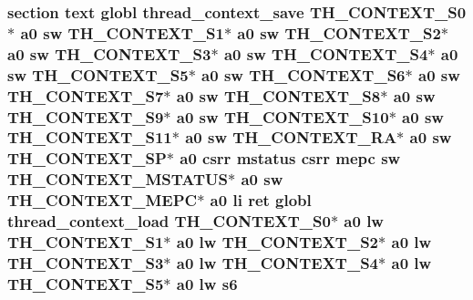 \hypertarget{riscv_2threada_8S_a4fd512995490ab20ebd3b565ccc498c7}{
\subsubsection[{s6}]{\setlength{\rightskip}{0pt plus 5cm}section text globl {\bf thread\-\_\-context\-\_\-save} {\bf T\-H\-\_\-\-C\-O\-N\-T\-E\-X\-T\-\_\-\-S0}$\ast$ {\bf a0} {\bf sw} {\bf T\-H\-\_\-\-C\-O\-N\-T\-E\-X\-T\-\_\-\-S1}$\ast$ {\bf a0} {\bf sw} {\bf T\-H\-\_\-\-C\-O\-N\-T\-E\-X\-T\-\_\-\-S2}$\ast$ {\bf a0} {\bf sw} {\bf T\-H\-\_\-\-C\-O\-N\-T\-E\-X\-T\-\_\-\-S3}$\ast$ {\bf a0} {\bf sw} {\bf T\-H\-\_\-\-C\-O\-N\-T\-E\-X\-T\-\_\-\-S4}$\ast$ {\bf a0} {\bf sw} {\bf T\-H\-\_\-\-C\-O\-N\-T\-E\-X\-T\-\_\-\-S5}$\ast$ {\bf a0} {\bf sw} {\bf T\-H\-\_\-\-C\-O\-N\-T\-E\-X\-T\-\_\-\-S6}$\ast$ {\bf a0} {\bf sw} {\bf T\-H\-\_\-\-C\-O\-N\-T\-E\-X\-T\-\_\-\-S7}$\ast$ {\bf a0} {\bf sw} {\bf T\-H\-\_\-\-C\-O\-N\-T\-E\-X\-T\-\_\-\-S8}$\ast$ {\bf a0} {\bf sw} {\bf T\-H\-\_\-\-C\-O\-N\-T\-E\-X\-T\-\_\-\-S9}$\ast$ {\bf a0} {\bf sw} {\bf T\-H\-\_\-\-C\-O\-N\-T\-E\-X\-T\-\_\-\-S10}$\ast$ {\bf a0} {\bf sw} {\bf T\-H\-\_\-\-C\-O\-N\-T\-E\-X\-T\-\_\-\-S11}$\ast$ {\bf a0} {\bf sw} {\bf T\-H\-\_\-\-C\-O\-N\-T\-E\-X\-T\-\_\-\-R\-A}$\ast$ {\bf a0} {\bf sw} {\bf T\-H\-\_\-\-C\-O\-N\-T\-E\-X\-T\-\_\-\-S\-P}$\ast$ {\bf a0} csrr {\bf mstatus} csrr {\bf mepc} {\bf sw} {\bf T\-H\-\_\-\-C\-O\-N\-T\-E\-X\-T\-\_\-\-M\-S\-T\-A\-T\-U\-S}$\ast$ {\bf a0} {\bf sw} {\bf T\-H\-\_\-\-C\-O\-N\-T\-E\-X\-T\-\_\-\-M\-E\-P\-C}$\ast$ {\bf a0} {\bf li} ret globl {\bf thread\-\_\-context\-\_\-load} {\bf T\-H\-\_\-\-C\-O\-N\-T\-E\-X\-T\-\_\-\-S0}$\ast$ {\bf a0} {\bf lw} {\bf T\-H\-\_\-\-C\-O\-N\-T\-E\-X\-T\-\_\-\-S1}$\ast$ {\bf a0} {\bf lw} {\bf T\-H\-\_\-\-C\-O\-N\-T\-E\-X\-T\-\_\-\-S2}$\ast$ {\bf a0} {\bf lw} {\bf T\-H\-\_\-\-C\-O\-N\-T\-E\-X\-T\-\_\-\-S3}$\ast$ {\bf a0} {\bf lw} {\bf T\-H\-\_\-\-C\-O\-N\-T\-E\-X\-T\-\_\-\-S4}$\ast$ {\bf a0} {\bf lw} {\bf T\-H\-\_\-\-C\-O\-N\-T\-E\-X\-T\-\_\-\-S5}$\ast$ {\bf a0} {\bf lw} s6}}\label{riscv_2threada_8S_a4fd512995490ab20ebd3b565ccc498c7}
